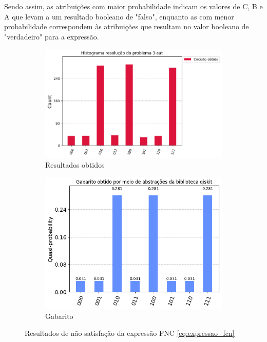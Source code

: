 \documentclass[12pt]{article}
\begin{document}
Sendo assim, as atribuições com maior probabilidade indicam os valores de C, B e A que levam a um resultado booleano de "falso", enquanto as com menor probabilidade correspondem às atribuições que resultam no valor booleano de "verdadeiro" para a expressão.

\begin{figure}
\centering
    \begin{subfigure}{0.4\textwidth}
        \centering
        \includegraphics[width=\textwidth]{histograma_circuito_obtido.png}
        \caption{Resultados obtidos}
        \label{fig:histograma_circuito}        
    \end{subfigure}
    \begin{subfigure}{0.419\textwidth}
        \centering
        \includegraphics[width=\textwidth]{gabarito_qiskit.png}
        \caption{Gabarito}
        \label{fig:gabarito_qiskit}        
    \end{subfigure}
    \caption{Resultados de não satisfação da expressão FNC \ref{eq:expressao_fcn}}
\end{figure}
\end{document}
